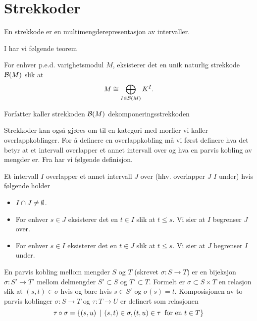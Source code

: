 \section{Strekkoder}
En strekkode er en multimengderepresentasjon av intervaller.

I \citep[teorem 2.4]{Bauer2018} har vi følgende teorem

\begin{teorem}\label{trm:DekompBark}
  For enhver p.e.d. varighetsmodul $M$, eksisterer det en
  unik naturlig strekkode $\mathcal{B}(M)$ slik at
  \[M\cong \bigoplus_{I\in\mathcal{B}(M)} K^I.\]
\end{teorem}

Forfatter kaller strekkoden $\mathcal{B}(M)$
dekomponeringsstrekkoden

%

Strekkoder kan også gjøres om til en kategori med morfier
vi kaller overlappkoblinger. For å definere en overlappkobling
må vi først definere hva det betyr at et intervall
overlapper et annet intervall over og hva en parvis
kobling av mengder er. Fra \citep[seksjon 2.3]{Bauer2018}
har vi følgende definisjon.
\begin{definisjon}
    Et intervall $I$ overlapper et annet intervall $J$
    over (hhv. overlapper $J$  $I$ under) hvis følgende
    holder
    \begin{itemize}
        \item $I\cap J\neq\emptyset$.
        \item For enhver $s\in J$ eksisterer det en $t\in I$ slik at $t\leq s$. Vi sier at $I$ begrenser $J$ over.
        \item For enhver $s\in I$ eksisterer det en $t\in J$ slik at $t\leq s$. Vi sier at $J$ begrenser $I$ under.
    \end{itemize}
\end{definisjon}

\begin{definisjon}\label{def:Parvis-Kobling}
  En parvis kobling mellom mengder $S$ og $T$ (skrevet
  $\sigma:S\to T$) er en bijeksjon $\sigma: S'\to T'$
  mellom delmengder $S'\subset S$ og $T'\subset T$.
  Formelt er $\sigma\subset S\times T$ en relasjon slik at
  $(s,t)\in \sigma$ hvis og bare hvis $s\in S'$ og
  $\sigma(s)=t$. Komposisjonen av to parvis koblinger
  $\sigma: S\to T$ og $\tau: T\to U$ er definert som
  relasjonen
  \[\tau\circ\sigma=\left\{(s,u)\,\mid\,(s,t)\in \sigma, (t,u)\in \tau\;\;\text{for en $t\in T$}\right\}\]
\end{definisjon}

